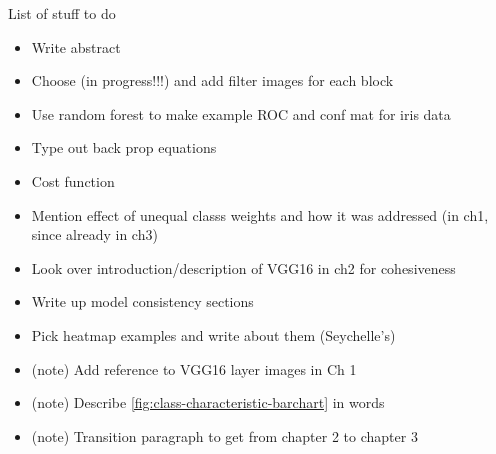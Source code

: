 
List of stuff to do

\begin{itemize}
\item Write abstract
\item Choose (in progress!!!) and add filter images for each block
\item Use random forest to make example ROC and conf mat for iris data
\item Type out back prop equations
\item Cost function
\item Mention effect of unequal classs weights and how it was addressed (in ch1, since already in ch3)
\item Look over introduction/description of VGG16 in ch2 for cohesiveness
\item Write up model consistency sections
\item Pick heatmap examples and write about them (Seychelle's)
\item (\fix note) Add reference to VGG16 layer images in Ch 1
\item (\fix note) Describe \autoref{fig:class-characteristic-barchart} in words
\item (\fix note) Transition paragraph to get from chapter 2 to chapter 3
\end{itemize}
